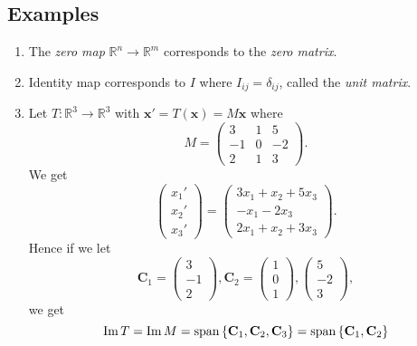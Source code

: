 \documentclass[10pt]{article}
\DeclareMathOperator{\im}{Im}
\begin{document}
    \subsection{Examples}
    \begin{example}
        \begin{enumerate}[(1)]
            \item The \textit{zero map} $ \mathbb{R}^{n}\to \mathbb{R}^{m} $ corresponds to the \textit{zero matrix}.
            \item Identity map corresponds to $ I $ where $ I_{ij}=\delta_{ij} $, called the \textit{unit matrix}.
            \item Let $ T:\mathbb{R}^{3}\to \mathbb{R}^{3} $ with $ \mathbf{x}'=T(\mathbf{x})=M \mathbf{x} $ where 
            \[
                M=\begin{pmatrix}
                    3&1&5\\-1&0&-2\\2&1&3
                \end{pmatrix}
            .\]
            We get 
            \[
                \begin{pmatrix}
                    x_1'\\x_2'\\x_3'
                \end{pmatrix}=\begin{pmatrix}
                    3x_1+x_2+5x_3\\-x_1-2x_3\\2x_1+x_2+3x_3
                \end{pmatrix}
            .\]
            Hence if we let 
            \[
                \mathbf{C}_1=\begin{pmatrix}
                    3\\-1\\2
                \end{pmatrix},
                \mathbf{C}_2=\begin{pmatrix}
                    1\\0\\1
                \end{pmatrix},
                \begin{pmatrix}
                    5\\-2\\3
                \end{pmatrix}
            ,\]
            we get 
            \[
                \im T=\im M = \spn\left\{ \mathbf{C}_1,\mathbf{C}_2,\mathbf{C}_3\right\}=\spn\left\{ \mathbf{C}_1, \mathbf{C}_2\right\}
\]
\end{enumerate}
\end{example}
\end{document}
